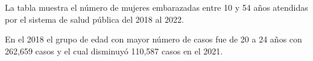 La tabla muestra el número de mujeres embarazadas entre 10 y 54 años atendidas por el sistema de salud pública del 2018 al 2022. 

En el 2018 el grupo de edad con mayor número de casos fue de 20 a 24 años con 262,659 casos y el cual disminuyó 110,587 casos en el 2021.


